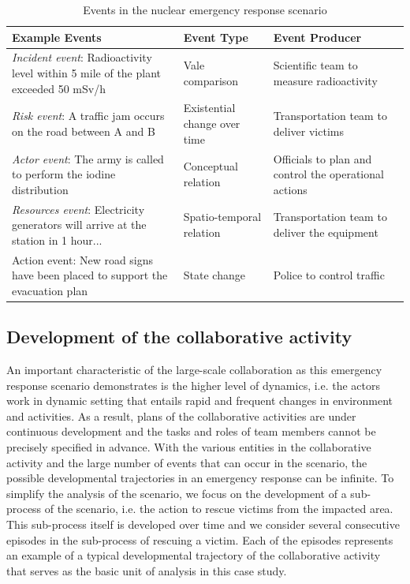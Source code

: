 \begin{table}[htbp]
\centering
\footnotesize
\begin{tabular}{>{\raggedright}p{1.8in}>{\raggedright}p{1.8in}>{\raggedright}p{1.8in}}

\toprule 
\textbf{Example Events} & \textbf{Event Type} & \textbf{Event Producer}\tabularnewline
\midrule 
\emph{Incident event}: Radioactivity level within 5 mile of the plant
exceeded 50 mSv/h & Vale comparison & Scientific team to measure radioactivity\tabularnewline
\midrule 
\emph{Risk event}: A traffic jam occurs on the road between A and
B  & Existential change over time & Transportation team to deliver victims\tabularnewline
\midrule 
\emph{Actor event}: The army is called to perform the iodine distribution & Conceptual relation & Officials to plan and control the operational actions\tabularnewline
\midrule 
\emph{Resources event}: Electricity generators will arrive at the station in 1 hour... & Spatio-temporal relation & Transportation team to deliver the equipment\tabularnewline
\midrule 
Action event: New road signs have been placed to support the evacuation
plan & State change & Police to control traffic\tabularnewline
\bottomrule

\end{tabular}	
\caption{Events in the nuclear emergency response scenario}
\label{tab:events_in_scenario}
\end{table}


\subsection{Development of the collaborative activity} %
\label{sub:event_driven_activity_development}
An important characteristic of the large-scale collaboration as this emergency response scenario demonstrates is the higher level of dynamics, i.e. the actors work in dynamic setting that entails rapid and frequent changes in environment and activities. As a result, plans of the collaborative activities are under continuous development and the tasks and roles of team members cannot be precisely specified in advance. With the various entities in the collaborative activity and the large number of events that can occur in the scenario, the possible developmental trajectories in an emergency response can be infinite. To simplify the analysis of the scenario, we focus on the development of a sub-process of the scenario, i.e. the action to rescue victims from the impacted area. This sub-process itself is developed over time and we consider several consecutive episodes in the sub-process of rescuing a victim. Each of the episodes represents an example of a typical developmental trajectory of the collaborative activity that serves as the basic unit of analysis in this case study.

